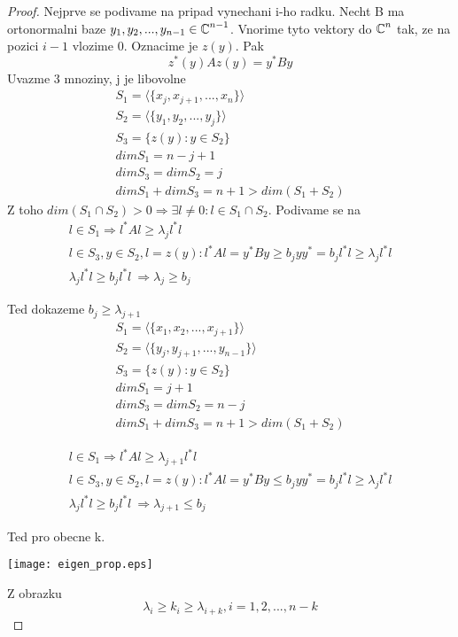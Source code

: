 \begin{proof}
	Nejprve se podivame na pripad vynechani i-ho radku.
	Necht B ma ortonormalni baze $y_1, y_2, ..., y_{n-1} \in \operatorname{\mathbb{C}}^{n - 1}$. Vnorime tyto vektory do $\operatorname{\mathbb{C}}^n$ tak, ze na pozici $i - 1$ vlozime 0.
	Oznacime je $z(y)$.
	Pak
	\[ z^{\ast}(y)Az(y) = y^{\ast}By \]
Uvazme 3 mnoziny, j je libovolne
	\begin{gather*}
		S_1 = \langle\{x_j, x_{j+1},..., x_n\} \rangle \\
		S_2 = \langle\{y_1, y_2,..., y_j\} \rangle \\
		S_3 = \{z(y): y \in S_2 \} \\
		dim S_1 = n - j + 1 \\
		dim S_3 = dim S_2 = j \\
		dim S_1 + dim S_3 = n+1 > dim (S_1 + S_2)
	\end{gather*}
	Z toho $dim(S_1 \cap S_2) > 0 \Rightarrow \exists l \ne 0 : l \in S_1 \cap S_2$.
	Podivame se na
	\begin{gather*}
		l \in S_1 \Rightarrow l^{\ast}Al \geq \lambda_j l^{\ast}l \\
		l \in S_3, y \in S_2, l = z(y): l^{\ast}Al = y^{\ast}By \geq b_j y y^{\ast} = b_j l^{\ast} l \geq \lambda_j l^{\ast}l \\
		\lambda_j l^{\ast}l \geq b_j l^{\ast}l\ \Rightarrow \lambda_j \geq b_j
	\end{gather*}

	Ted dokazeme $ b_j \geq \lambda_{j + 1} $
	\begin{gather*}
		S_1 = \langle\{x_1, x_2,..., x_{j+1}\} \rangle \\
		S_2 = \langle\{y_j, y_{j+1},..., y_{n-1}\} \rangle \\
		S_3 = \{z(y): y \in S_2 \} \\
		dim S_1 = j + 1 \\
		dim S_3 = dim S_2 = n - j \\
		dim S_1 + dim S_3 = n+1 > dim (S_1 + S_2)
	\end{gather*}

	\begin{gather*}
		l \in S_1 \Rightarrow l^{\ast}Al \geq \lambda_{j + 1} l^{\ast}l \\
		l \in S_3, y \in S_2, l = z(y): l^{\ast}Al = y^{\ast}By \leq b_j y y^{\ast} = b_j l^{\ast} l \geq \lambda_j l^{\ast}l \\
		\lambda_j l^{\ast}l \geq b_j l^{\ast}l\ \Rightarrow \lambda_{j + 1} \leq b_j
	\end{gather*}

	Ted pro obecne k.

	\texttt{[image: eigen\_prop.eps]}

	Z obrazku
	\[ \lambda_i \geq k_i \geq \lambda_{i + k}, i = 1,2,..., n-k  \]

\end{proof}

